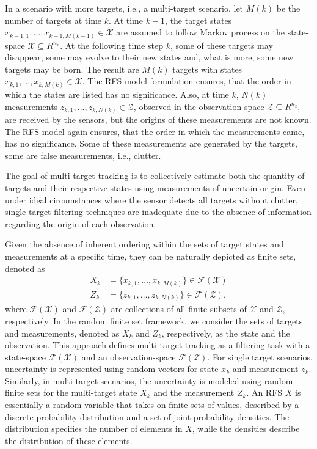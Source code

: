 In a scenario with more targets, i.e., a multi-target scenario, let $M(k)$ be the number of targets at time $k$. At
time $k-1$, the target states $x_{k-1,1}, \dots, x_{k-1,M(k-1)} \in \mathcal{X}$ are assumed to follow Markov process
on the state-space $\mathcal{X} \subseteq R^{n_x}$. At the
following
time step $k$, some of these targets may disappear, some may evolve to their new states and, what is more, some new
targets may be born. The result are $M(k)$ targets with states $x_{k,1},\dots, x_{k,M(k)} \in \mathcal{X}$. The RFS
model formulation ensures, that the order in which the states are listed has no significance. Also, at time $k$, $N(k
)$ measurements $z_{k,1},\dots,z_{k,N(k)} \in \mathcal{Z}$, observed in the observation-space $\mathcal{Z} \subseteq
R^{n_z}$, are received by the
sensors, but the origins
of these measurements are not known. The RFS model again ensures, that the order in which the measurements came, has
no significance. Some of these measurements are generated by the targets, some are false measurements, i.e., clutter.

The goal of multi-target tracking is to collectively estimate both the quantity of targets and their respective states using measurements of uncertain origin. Even under ideal circumstances where the sensor detects all targets without clutter, single-target filtering techniques are inadequate due to the absence of information regarding the origin of each observation.

Given the absence of inherent ordering within the sets of target states and measurements at a specific time, they can be naturally depicted as finite sets, denoted as
\begin{align}
    X_k &= \{x_{k,1},\dots, x_{k,M(k)}\} \in \mathcal{F}(\mathcal{X}) \\
    Z_k &= \{z_{k,1},\dots, z_{k,N(k)}\} \in \mathcal{F}(\mathcal{Z}),
\end{align}
where $\mathcal{F}(\mathcal{X})$ and $\mathcal{F}(\mathcal{Z})$ are collections of all finite subsets of $\mathcal{X}$ and $\mathcal{Z}$, respectively. In the random finite set framework, we consider the sets of targets and measurements, denoted as $X_k$ and $Z_k$, respectively, as the state and the observation. This approach defines multi-target tracking as a filtering task with a state-space $\mathcal{F}(\mathcal{X})$ and an observation-space $\mathcal{F}(\mathcal{Z})$. For single target scenarios, uncertainty is represented using random vectors for state $x_k$ and measurement $z_k$. Similarly, in multi-target scenarios, the uncertainty is modeled using random finite sets for the multi-target state $X_k$ and the measurement $Z_k$. An RFS $X$ is essentially a random variable that takes on finite sets of values, described by a discrete probability distribution and a set of joint probability densities. The distribution specifies the number of elements in $X$, while the densities describe the distribution of these elements.

